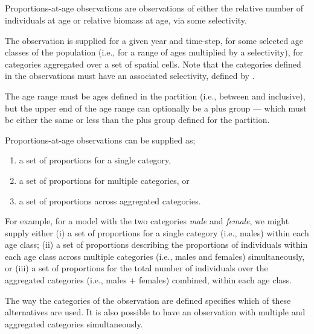 \subsection{}

Proportions-at-age observations are observations of either the relative number of individuals at age or relative biomass at age, via some selectivity. 

The observation is supplied for a given year and time-step, for some selected age classes of the population (i.e., for a range of ages multiplied by a selectivity), for categories aggregated over a set of spatial cells. Note that the categories defined in the observations must have an associated selectivity, defined by .

The age range must be ages defined in the partition (i.e., between  and  inclusive), but the upper end of the age range can optionally be a plus group --- which must be either the same or less than the plus group defined for the partition. 

Proportions-at-age observations can be supplied as; 
\begin{enumerate}
\item a set of proportions for a single category, 
\item a set of proportions for multiple categories, or
\item a set of proportions across aggregated categories.
\end{enumerate}

For example, for a model with the two categories \emph{male} and \emph{female}, we might supply either (i) a set of proportions for a single category (i.e., males) within each age class; (ii) a set of proportions describing the proportions of individuals within each age class across multiple categories (i.e., males and females) simultaneously, or (iii) a set of proportions for the total number of individuals over the aggregated categories  (i.e., males $+$ females) combined, within each age class.

The way the categories of the observation are defined specifies which of these alternatives are used. It is also possible to have an observation with multiple and aggregated categories simultaneously.

\subsubsection*{}

